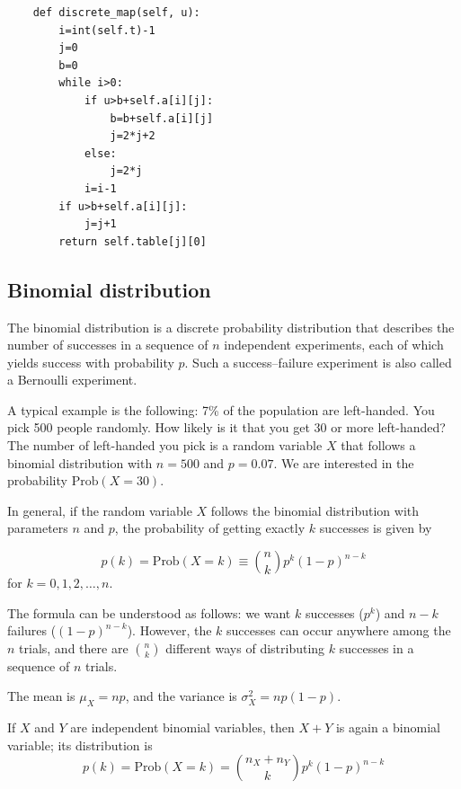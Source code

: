 \documentclass[justified,sixbynine]{tufte-book}
\theoremstyle{plain}%
\theoremstyle{definition}
\theoremstyle{remark}
\begin{document}
\begin{fullwidth}
\begin{lstlisting}
    def discrete_map(self, u):
        i=int(self.t)-1
        j=0
        b=0
        while i>0:
            if u>b+self.a[i][j]:
                b=b+self.a[i][j]
                j=2*j+2
            else:
                j=2*j
            i=i-1
        if u>b+self.a[i][j]:
            j=j+1
        return self.table[j][0]
\end{lstlisting}


\goodbreak\subsection{Binomial distribution}


The binomial distribution is a discrete probability distribution that
describes the number of successes in a sequence of $n$ independent
experiments, each of which yields success with probability $p$. Such a
success--failure experiment is also called a Bernoulli experiment.

A typical example is the following: 7\% of the population are left-handed.
You pick 500 people randomly. How likely is it that you get 30 or more
left-handed? The number of left-handed you pick is a random variable $X$
that follows a binomial distribution with $n=500$ and $p=0.07$. We are
interested in the probability $\textrm{Prob}(X=30)$.

In general, if the random variable $X$ follows the binomial distribution with
parameters $n$ and $p$, the probability of getting exactly $k$ successes is
given by

\begin{equation}
p(k)=\textrm{Prob}(X=k) \equiv  \binom nkp^k(1-p)^{n-k}
\end{equation}
for $k=0,1,2,\dots,n$.

The formula can be understood as follows: we want $k$ successes ($p^k$) and $%
n-k$ failures ($(1-p)^{n-k}$). However, the $k$ successes can occur anywhere
among the $n$ trials, and there are $\binom nk$ different ways of distributing
$k$ successes in a sequence of $n$ trials.

The mean is $\mu _X=np$, and the variance is $\sigma _X^2=np(1-p)$.

If $X$ and $Y$ are independent binomial variables, then $X+Y$ is again a
binomial variable; its distribution is
\begin{equation}
p(k)=\textrm{Prob}(X=k)=\binom{n_X+n_Y}kp^k(1-p)^{n-k}
\end{equation}


\end{fullwidth}
\end{document}
